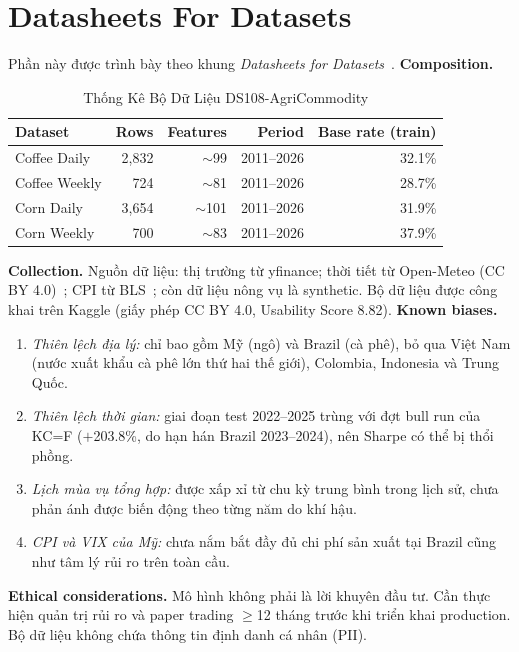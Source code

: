 \documentclass[conference]{IEEEtran}
\begin{document}
\section*{Datasheets For Datasets}
Phần này được trình bày theo khung \textit{Datasheets for Datasets}~\cite{gebru2021}.
\textbf{Composition.}
\begin{table}[h]
\caption{Thống Kê Bộ Dữ Liệu DS108-AgriCommodity}
\label{tab:dataset_stats}
\centering
\begin{tabular}{@{}lrrrr@{}}
\toprule
\textbf{Dataset} & \textbf{Rows} & \textbf{Features} & \textbf{Period} & \textbf{Base rate (train)} \\
\midrule
Coffee Daily  & 2,832 & $\sim$99 & 2011--2026 & 32.1\% \\
Coffee Weekly & 724   & $\sim$81 & 2011--2026 & 28.7\% \\
Corn Daily    & 3,654 & $\sim$101 & 2011--2026 & 31.9\% \\
Corn Weekly   & 700   & $\sim$83 & 2011--2026 & 37.9\% \\
\bottomrule
\end{tabular}
\end{table}
\textbf{Collection.} Nguồn dữ liệu: thị trường từ yfinance; thời tiết từ
Open-Meteo (CC BY 4.0)~\cite{zippenfenig2023}; CPI từ BLS~\cite{bls2026}; còn
dữ liệu nông vụ là synthetic. Bộ dữ liệu được công khai trên Kaggle (giấy
phép CC BY 4.0, Usability Score 8.82).
\textbf{Known biases.}
\begin{enumerate}
\item \textit{Thiên lệch địa lý:} chỉ bao gồm Mỹ (ngô) và Brazil (cà phê),
bỏ qua Việt Nam (nước xuất khẩu cà phê lớn thứ hai thế giới), Colombia,
Indonesia và Trung Quốc.
\item \textit{Thiên lệch thời gian:} giai đoạn test 2022--2025 trùng với đợt
bull run của KC=F ($+$203.8\%, do hạn hán Brazil 2023--2024), nên Sharpe có
thể bị thổi phồng.
\item \textit{Lịch mùa vụ tổng hợp:} được xấp xỉ từ chu kỳ trung bình trong
lịch sử, chưa phản ánh được biến động theo từng năm do khí hậu.
\item \textit{CPI và VIX của Mỹ:} chưa nắm bắt đầy đủ chi phí sản xuất tại
Brazil cũng như tâm lý rủi ro trên toàn cầu.
\end{enumerate}
\textbf{Ethical considerations.} Mô hình không phải là lời khuyên đầu tư. Cần
thực hiện quản trị rủi ro và paper trading $\geq$12 tháng trước khi triển khai
production. Bộ dữ liệu không chứa thông tin định danh cá nhân (PII).
\end{document}
